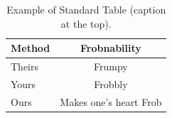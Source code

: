 {%







\begin{table}
  \centering
  \caption{\label{tab:example}%
    Example of Standard Table (caption at the top).
  }
  \begin{tabular}{lc}
    \toprule
    Method & Frobnability \\
    \midrule
    Theirs & Frumpy \\
    Yours & Frobbly \\
    Ours & Makes one's heart Frob\\
    \bottomrule
  \end{tabular}
\end{table}

\begin{figure}[t]
  \centering
  \fbox{\rule{0pt}{2in} \rule{0.9\linewidth}{0pt}}


\end{figure}}
